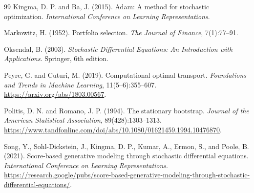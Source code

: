\documentclass{article}
\begin{document}
\begin{thebibliography}{99}
Kingma, D. P. and Ba, J. (2015).
\newblock Adam: A method for stochastic optimization.
\newblock \emph{International Conference on Learning Representations}.

Markowitz, H. (1952).
\newblock Portfolio selection.
\newblock \emph{The Journal of Finance}, 7(1):77--91.

Oksendal, B. (2003).
\newblock \emph{Stochastic Differential Equations: An Introduction with
Applications}.
\newblock Springer, 6th edition.

Peyre, G. and Cuturi, M. (2019).
\newblock Computational optimal transport.
\newblock \emph{Foundations and Trends in Machine Learning}, 11(5--6):355--607.
\newblock \url{https://arxiv.org/abs/1803.00567}.

Politis, D. N. and Romano, J. P. (1994).
\newblock The stationary bootstrap.
\newblock \emph{Journal of the American Statistical Association}, 89(428):1303--1313.
\newblock \url{https://www.tandfonline.com/doi/abs/10.1080/01621459.1994.10476870}.

Song, Y., Sohl-Dickstein, J., Kingma, D. P., Kumar, A., Ermon, S., and Poole, B.
(2021).
\newblock Score-based generative modeling through stochastic differential
equations.
\newblock \emph{International Conference on Learning Representations}.
\newblock \url{https://research.google/pubs/score-based-generative-modeling-through-stochastic-differential-equations/}.

\end{thebibliography}
\end{document}
